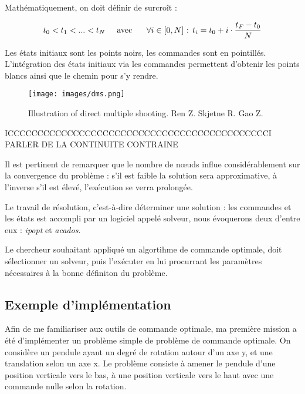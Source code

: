 Mathématiquement, on doit définir de surcroît :

\begin{description}
\setlength\itemsep{-0.5em}
\item[Subdivision du temps :] \[t_{0} < t_{1} < ... < t_{N} \text{\tab avec \tab } \forall i \in [0, N] \text{  :  } t_{i} = t_{0} + i \cdot \frac{t_{F}-t_{0}}{N} \]
\end{description}

Les états initiaux sont les points noirs, les commandes sont en pointillés. L'intégration des états initiaux via les commandes permettent d'obtenir les points blancs ainsi que le chemin pour s'y rendre.

\begin{figure}[H]
\begin{center}
\texttt{[image: images/dms.png]}
\caption{Illustration of direct multiple shooting. Ren Z. Skjetne R. Gao Z. \cite{dms}}
\end{center}
\end{figure}
ICCCCCCCCCCCCCCCCCCCCCCCCCCCCCCCCCCCCCCCCCCCCI PARLER DE LA CONTINUITE CONTRAINE %

Il est pertinent de remarquer que le nombre de nœuds influe considérablement sur la convergence du problème : s'il est faible la solution sera approximative, à l'inverse s'il est élevé, l'exécution se verra prolongée.

Le travail de résolution, c'est-à-dire déterminer une solution : les commandes et les états est accompli par un logiciel appelé solveur, nous évoquerons deux d'entre eux : \emph{\gls{ipopt}} et \emph{\gls{acados}}.

Le chercheur souhaitant appliqué un algortihme de commande optimale, doit sélectionner un solveur, puis l’exécuter en lui procurrant les paramètres nécessaires à la bonne définiton du problème.
        
            \subsection{Exemple d'implémentation}

Afin de me familiariser aux outils de commande optimale, ma première mission a été d'implémenter un problème simple de problème de commande optimale. On considère un pendule ayant un degré de rotation autour d'un axe y, et une translation selon un axe x. Le problème consiste à amener le pendule d'une position verticale vers le bas, à une position verticale vers le haut avec une commande nulle selon la rotation.

